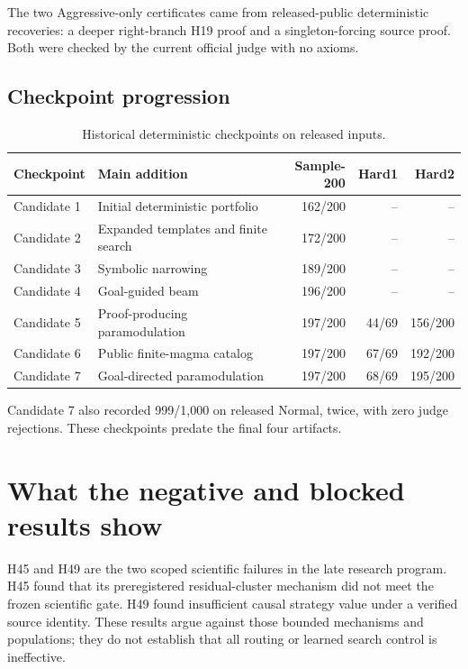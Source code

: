 \documentclass[10pt]{article}
\begin{document}
The two Aggressive-only certificates came from released-public deterministic recoveries: a deeper right-branch H19 proof and a singleton-forcing source proof. Both were checked by the current official judge with no axioms.

\subsection{Checkpoint progression}

\begin{table}[ht]
\centering
\caption{Historical deterministic checkpoints on released inputs.}
\label{tab:checkpoints}
\begin{tabularx}{\textwidth}{l Y r r r}
\toprule
Checkpoint & Main addition & Sample-200 & Hard1 & Hard2 \\
\midrule
Candidate 1 & Initial deterministic portfolio & 162/200 & -- & -- \\
Candidate 2 & Expanded templates and finite search & 172/200 & -- & -- \\
Candidate 3 & Symbolic narrowing & 189/200 & -- & -- \\
Candidate 4 & Goal-guided beam & 196/200 & -- & -- \\
Candidate 5 & Proof-producing paramodulation & 197/200 & 44/69 & 156/200 \\
Candidate 6 & Public finite-magma catalog & 197/200 & 67/69 & 192/200 \\
Candidate 7 & Goal-directed paramodulation & 197/200 & 68/69 & 195/200 \\
\bottomrule
\end{tabularx}
\end{table}

Candidate 7 also recorded 999/1,000 on released Normal, twice, with zero judge rejections. These checkpoints predate the final four artifacts.

\section{What the negative and blocked results show}

H45 and H49 are the two scoped scientific failures in the late research program. H45 found that its preregistered residual-cluster mechanism did not meet the frozen scientific gate. H49 found insufficient causal strategy value under a verified source identity. These results argue against those bounded mechanisms and populations; they do not establish that all routing or learned search control is ineffective.
\end{document}

